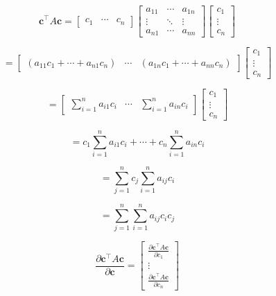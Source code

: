 \documentclass[12pt]{article}
\begin{document}

\begin{enumerate}


\[
\mathbf{c}^\top A \mathbf{c} =
\begin{bmatrix}
c_1 & \cdots & c_n
\end{bmatrix}
\begin{bmatrix}
a_{11} & \cdots & a_{1n} \\
\vdots & \ddots & \vdots \\
a_{n1} & \cdots & a_{nn}
\end{bmatrix}
\begin{bmatrix}
c_1 \\
\vdots \\
c_n
\end{bmatrix}
\]

\[
=
\begin{bmatrix}
(a_{11}c_1 + \cdots + a_{n1}c_n) & \cdots & (a_{1n}c_1 + \cdots + a_{nn}c_n)
\end{bmatrix}
\begin{bmatrix}
c_1 \\
\vdots \\
c_n
\end{bmatrix}
\]

\[
=
\begin{bmatrix}
\sum\limits_{i=1}^{n} a_{i1} c_i & \cdots & \sum\limits_{i=1}^{n} a_{in} c_i
\end{bmatrix}
\begin{bmatrix}
c_1 \\
\vdots \\
c_n
\end{bmatrix}
\]

\[
=
c_1 \sum\limits_{i=1}^{n} a_{i1} c_i + \cdots + c_n \sum\limits_{i=1}^{n} a_{in} c_i
\]

\[
=
\sum\limits_{j=1}^{n} c_j \sum\limits_{i=1}^{n} a_{ij} c_i
\]

\[
=
\sum\limits_{j=1}^{n} \sum\limits_{i=1}^{n} a_{ij} c_i c_j
\]

\[
\frac{\partial \mathbf{c}^\top A \mathbf{c}}{\partial \mathbf{c}} =
\begin{bmatrix}
\frac{\partial \mathbf{c}^\top A \mathbf{c}}{\partial c_1} \\
\vdots \\
\frac{\partial \mathbf{c}^\top A \mathbf{c}}{\partial c_n}
\end{bmatrix}
\]


\end{enumerate}
\end{document}

